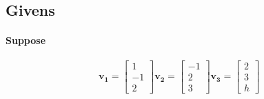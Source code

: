 \documentclass{article}
\begin{document}
                \subsection{Givens}
                    \paragraph{Suppose}
                        \[
                        \mathbf{v_1}=\begin{bmatrix}1\\-1\\2\end{bmatrix}
                        \mathbf{v_2}=\begin{bmatrix}-1\\2\\3\end{bmatrix}
                        \mathbf{v_3}=\begin{bmatrix}2\\3\\h\end{bmatrix}
                        \]
\end{document}

